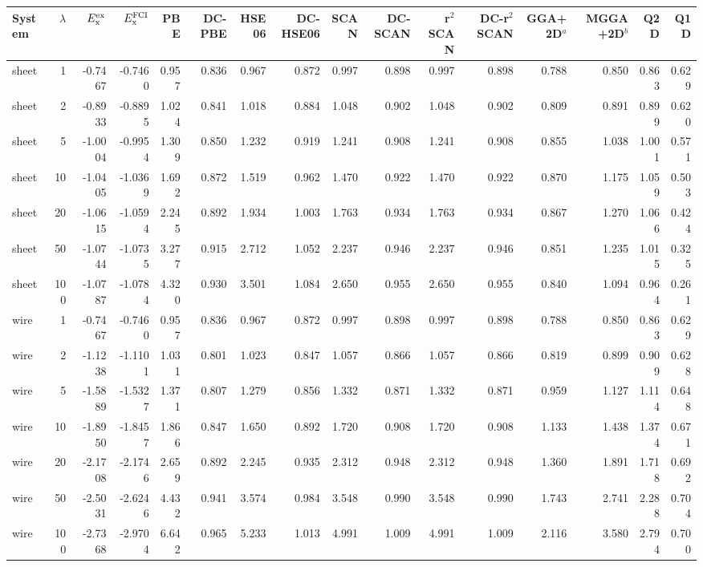 \begin{tabular}{lrrrrrrrrrrrrrrr}
\toprule
System & $\lambda$ & $E_{\rm x}^{\rm ex}$ & $E_{\rm x}^{\rm FCI}$ & PBE & DC-PBE & HSE06 & DC-HSE06 & SCAN & DC-SCAN & r$^2$SCAN & DC-r$^2$SCAN & GGA+2D$^a$ & MGGA+2D$^b$ & Q2D & Q1D \\
\midrule
sheet & 1 & -0.7467 & -0.7460 & 0.957 & 0.836 & 0.967 & 0.872 & 0.997 & 0.898 & 0.997 & 0.898 & 0.788 & 0.850 & 0.863 & 0.629 \\
sheet & 2 & -0.8933 & -0.8895 & 1.024 & 0.841 & 1.018 & 0.884 & 1.048 & 0.902 & 1.048 & 0.902 & 0.809 & 0.891 & 0.899 & 0.620 \\
sheet & 5 & -1.0004 & -0.9954 & 1.309 & 0.850 & 1.232 & 0.919 & 1.241 & 0.908 & 1.241 & 0.908 & 0.855 & 1.038 & 1.001 & 0.571 \\
sheet & 10 & -1.0405 & -1.0369 & 1.692 & 0.872 & 1.519 & 0.962 & 1.470 & 0.922 & 1.470 & 0.922 & 0.870 & 1.175 & 1.059 & 0.503 \\
sheet & 20 & -1.0615 & -1.0594 & 2.245 & 0.892 & 1.934 & 1.003 & 1.763 & 0.934 & 1.763 & 0.934 & 0.867 & 1.270 & 1.066 & 0.424 \\
sheet & 50 & -1.0744 & -1.0735 & 3.277 & 0.915 & 2.712 & 1.052 & 2.237 & 0.946 & 2.237 & 0.946 & 0.851 & 1.235 & 1.015 & 0.325 \\
sheet & 100 & -1.0787 & -1.0784 & 4.320 & 0.930 & 3.501 & 1.084 & 2.650 & 0.955 & 2.650 & 0.955 & 0.840 & 1.094 & 0.964 & 0.261 \\
\midrule
wire & 1 & -0.7467 & -0.7460 & 0.957 & 0.836 & 0.967 & 0.872 & 0.997 & 0.898 & 0.997 & 0.898 & 0.788 & 0.850 & 0.863 & 0.629 \\
wire & 2 & -1.1238 & -1.1101 & 1.031 & 0.801 & 1.023 & 0.847 & 1.057 & 0.866 & 1.057 & 0.866 & 0.819 & 0.899 & 0.909 & 0.628 \\
wire & 5 & -1.5889 & -1.5327 & 1.371 & 0.807 & 1.279 & 0.856 & 1.332 & 0.871 & 1.332 & 0.871 & 0.959 & 1.127 & 1.114 & 0.648 \\
wire & 10 & -1.8950 & -1.8457 & 1.866 & 0.847 & 1.650 & 0.892 & 1.720 & 0.908 & 1.720 & 0.908 & 1.133 & 1.438 & 1.374 & 0.671 \\
wire & 20 & -2.1708 & -2.1746 & 2.659 & 0.892 & 2.245 & 0.935 & 2.312 & 0.948 & 2.312 & 0.948 & 1.360 & 1.891 & 1.718 & 0.692 \\
wire & 50 & -2.5031 & -2.6246 & 4.432 & 0.941 & 3.574 & 0.984 & 3.548 & 0.990 & 3.548 & 0.990 & 1.743 & 2.741 & 2.288 & 0.704 \\
wire & 100 & -2.7368 & -2.9704 & 6.642 & 0.965 & 5.233 & 1.013 & 4.991 & 1.009 & 4.991 & 1.009 & 2.116 & 3.580 & 2.794 & 0.700 \\
\bottomrule
\end{tabular}

